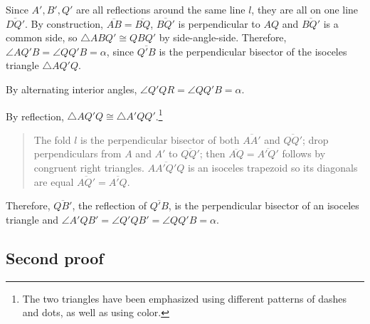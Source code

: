 Since $A', B', Q'$ are all reflections around the same line $l$, they are all on one line $\overline{DQ'}$. By construction, $\overline{AB}=\overline{BQ}$, $\overline{BQ'}$ is perpendicular to $AQ$ and $\overline{BQ'}$ is a common side, so $\triangle ABQ'\cong QBQ'$ by side-angle-side. Therefore, $\angle AQ'B=\angle QQ'B=\alpha$, since $\overline{Q'B}$ is the perpendicular bisector of the isoceles triangle $\triangle AQ'Q$.

By alternating interior angles, $\angle Q'QR=\angle QQ'B=\alpha$.

By reflection, $\triangle AQ'Q\cong \triangle A'QQ'$.\footnote{The two triangles have been emphasized using different patterns of dashes and dots, as well as using color.}
\begin{quote}
The fold $l$ is the perpendicular bisector of both $\overline{AA'}$ and $\overline{QQ'}$; drop perpendiculars from $A$ and $A'$ to $\overline{QQ'}$; then $\overline{AQ}=\overline{A'Q'}$ follows by congruent right triangles. $\overline{AA'Q'Q}$ is an isoceles trapezoid so its diagonals are equal $\overline{AQ'}=\overline{A'Q}$.
\end{quote}
Therefore, $\overline{QB'}$, the reflection of $\overline{Q'B}$, is the perpendicular bisector of an isoceles triangle and $\angle A'QB'=\angle Q'QB'=\angle QQ'B=\alpha$.


\subsection{Second proof}

